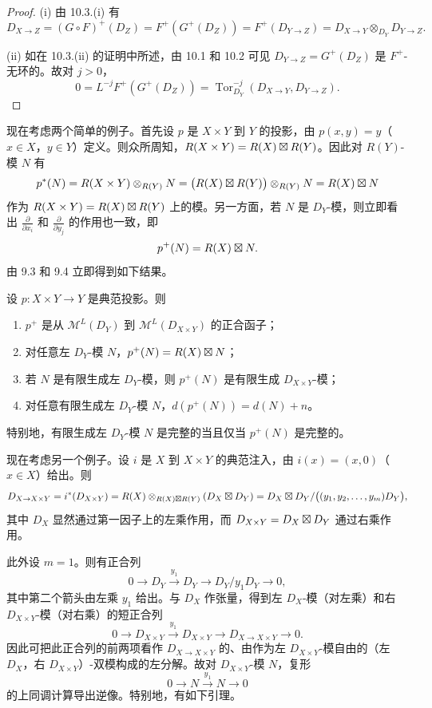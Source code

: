 \begin{proof}
(i) 由 10.3.(i) 有
$$D_{X\to Z}=(G\circ F)^+(D_Z)=F^+(G^+(D_Z))=F^+(D_{Y\to Z})=D_{X\to Y}\otimes_{D_Y}D_{Y\to Z}.$$

(ii) 如在 10.3.(ii) 的证明中所述，由 10.1 和 10.2 可见 $D_{Y\to Z}=G^+(D_Z)$ 是 $F^+$-无环的。故对 $j>0$，
$$0=L^{-j}F^+(G^+(D_Z))=\operatorname{Tor}^{-j}_{D_Y}(D_{X\to Y},D_{Y\to Z}).$$
\end{proof}

现在考虑两个简单的例子。首先设 $p$ 是 $X\times Y$ 到 $Y$ 的投影，由 $p(x,y)=y$（$x\in X$，$y\in Y$）定义。则众所周知，$R(X\times Y)=R(X)\mathbin{\boxtimes} R(Y)$。因此对 $R(Y)$-模 $N$ 有
$$p^*(N)=R(X\times Y)\otimes_{R(Y)}N=\bigl(R(X)\mathbin{\boxtimes} R(Y)\bigr)\otimes_{R(Y)}N=R(X)\mathbin{\boxtimes} N$$
作为 $R(X\times Y)=R(X)\mathbin{\boxtimes} R(Y)$ 上的模。另一方面，若 $N$ 是 $D_Y$-模，则立即看出 $\frac{\partial}{\partial x_i}$ 和 $\frac{\partial}{\partial y_j}$ 的作用也一致，即
$$p^+(N)=R(X)\mathbin{\boxtimes} N.$$
由 9.3 和 9.4 立即得到如下结果。

\begin{proposition}
设 $p:X\times Y\longrightarrow Y$ 是典范投影。则
\begin{enumerate}[label=(\roman*)]
  \item $p^+$ 是从 $\mathcal{M}^L(D_Y)$ 到 $\mathcal{M}^L(D_{X\times Y})$ 的正合函子；
  \item 对任意左 $D_Y$-模 $N$，$p^+(N)=R(X)\mathbin{\boxtimes} N$；
  \item 若 $N$ 是有限生成左 $D_Y$-模，则 $p^+(N)$ 是有限生成 $D_{X\times Y}$-模；
  \item 对任意有限生成左 $D_Y$-模 $N$，$d(p^+(N))=d(N)+n$。
\end{enumerate}
特别地，有限生成左 $D_Y$-模 $N$ 是完整的当且仅当 $p^+(N)$ 是完整的。
\end{proposition}

现在考虑另一个例子。设 $i$ 是 $X$ 到 $X\times Y$ 的典范注入，由 $i(x)=(x,0)$（$x\in X$）给出。则
$$D_{X\to X\times Y}=i^*(D_{X\times Y})=R(X)\otimes_{R(X)\mathbin{\boxtimes} R(Y)}(D_X\mathbin{\boxtimes} D_Y)=D_X\mathbin{\boxtimes} D_Y/\bigl((y_1,y_2,\dots,y_m)D_Y\bigr),$$
其中 $D_X$ 显然通过第一因子上的左乘作用，而 $D_{X\times Y}=D_X\mathbin{\boxtimes} D_Y$ 通过右乘作用。

此外设 $m=1$。则有正合列
$$0\longrightarrow D_Y\xrightarrow{\ y_1\ }D_Y\longrightarrow D_Y/y_1D_Y\longrightarrow 0,$$
其中第二个箭头由左乘 $y_1$ 给出。与 $D_X$ 作张量，得到左 $D_X$-模（对左乘）和右 $D_{X\times Y}$-模（对右乘）的短正合列
$$0\longrightarrow D_{X\times Y}\xrightarrow{\ y_1\ }D_{X\times Y}\longrightarrow D_{X\to X\times Y}\longrightarrow 0.$$
因此可把此正合列的前两项看作 $D_{X\to X\times Y}$ 的、由作为左 $D_{X\times Y}$-模自由的（左 $D_X$，右 $D_{X\times Y}$）-双模构成的左分解。故对 $D_{X\times Y}$-模 $N$，复形
$$0\longrightarrow N\xrightarrow{\ y_1\ }N\longrightarrow 0$$
的上同调计算导出逆像。特别地，有如下引理。

